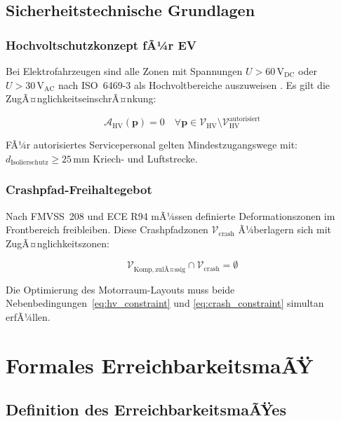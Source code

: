 ﻿\documentclass[12pt,a4paper]{article}
\begin{document}
\subsection{Sicherheitstechnische Grundlagen}

\subsubsection{Hochvoltschutzkonzept fÃ¼r EV}

Bei Elektrofahrzeugen sind alle Zonen mit Spannungen $U > 60\,\mathrm{V}_\mathrm{DC}$
oder $U > 30\,\mathrm{V}_\mathrm{AC}$ nach ISO~6469-3 als Hochvoltbereiche
auszuweisen \cite{ISO6469}. Es gilt die ZugÃ¤nglichkeitseinschrÃ¤nkung:

\begin{equation}
	\mathcal{A}_\mathrm{HV}(\mathbf{p}) = 0 \quad \forall \mathbf{p} \in
	\mathcal{V}_\mathrm{HV} \setminus \mathcal{V}_\mathrm{HV}^\mathrm{autorisiert}
	\label{eq:hv_constraint}
\end{equation}

FÃ¼r autorisiertes Servicepersonal gelten Mindestzugangswege mit:
$d_\mathrm{Isolierschutz} \geq 25\,\mathrm{mm}$ Kriech- und Luftstrecke.

\subsubsection{Crashpfad-Freihaltegebot}

Nach FMVSS~208 und ECE R94 mÃ¼ssen definierte Deformationszonen im Frontbereich
freibleiben. Diese Crashpfadzonen $\mathcal{V}_\mathrm{crash}$ Ã¼berlagern sich
mit ZugÃ¤nglichkeitszonen:

\begin{equation}
	\mathcal{V}_\mathrm{Komp,zulÃ¤ssig} \cap \mathcal{V}_\mathrm{crash} = \emptyset
	\label{eq:crash_constraint}
\end{equation}

Die Optimierung des Motorraum-Layouts muss beide Nebenbedingungen~\eqref{eq:hv_constraint}
und \eqref{eq:crash_constraint} simultan erfÃ¼llen.

\section{Formales ErreichbarkeitsmaÃŸ}
\label{sec:erreichbarkeit}

\subsection{Definition des ErreichbarkeitsmaÃŸes}
\end{document}
